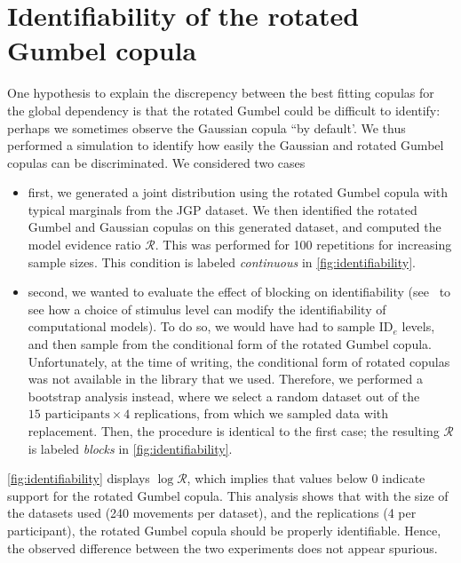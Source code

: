 \documentclass[acmlarge, manuscript,review]{acmart}
\newcommand{\ide}{\ensuremath{{\text{ID}_e}}\xspace}
\begin{document}
\section{Identifiability of the rotated Gumbel copula\label{app:identifiability}}
One hypothesis to explain the discrepency between the best fitting copulas for the global dependency is that the rotated Gumbel could be difficult to identify: perhaps we sometimes observe the Gaussian copula ``by default'. We thus performed a simulation to identify how easily the Gaussian and rotated Gumbel copulas can be discriminated. We considered two cases
\begin{itemize}
	\item first, we generated a joint distribution using the rotated Gumbel copula with typical marginals from the JGP dataset. We then identified the rotated Gumbel and Gaussian copulas on this generated dataset, and computed the model evidence ratio $\mathcal{R}$. This was performed for 100 repetitions for increasing sample sizes. This condition is labeled \textit{continuous} in \autoref{fig:identifiability}.
	\item second, we wanted to evaluate the effect of blocking on identifiability (see~\cite{gori2024} to see how a choice of stimulus level can modify the identifiability of computational models). To do so, we would have had to sample \ide levels, and then sample from the conditional form of the rotated Gumbel copula. Unfortunately, at the time of writing, the conditional form of rotated copulas was not available in the library that we used. Therefore, we performed a bootstrap analysis instead, where we select a random dataset out of the $15 \text{ participants} \times 4 \text{ replications}$, from which we sampled data with replacement. Then, the procedure is identical to the first case; the resulting $\mathcal{R}$ is labeled \textit{blocks} in \autoref{fig:identifiability}.
\end{itemize}

\autoref{fig:identifiability} displays $\log \mathcal{R}$, which implies that values below 0 indicate support for the rotated Gumbel copula. This analysis shows that with the size of the datasets used (240 movements per dataset), and the replications (4 per participant), the rotated Gumbel copula should be properly identifiable. Hence, the observed difference between the two experiments does not appear spurious.
\end{document}
